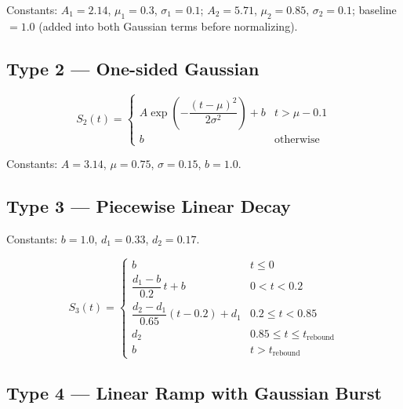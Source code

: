 \documentclass{article}
\begin{document}
\noindent
Constants: $A_1 = 2.14$, $\mu_1 = 0.3$, $\sigma_1 = 0.1$; $A_2 = 5.71$, $\mu_2 = 0.85$,
$\sigma_2 = 0.1$; baseline $= 1.0$ (added into both Gaussian terms before normalizing).

\subsection*{Type 2 --- One-sided Gaussian}

\begin{equation}\label{eq:type2}
    S_2(t) = \begin{cases}
        A \exp\!\left(-\dfrac{(t - \mu)^2}{2\sigma^2}\right) + b & t > \mu - 0.1 \\[6pt]
        b & \text{otherwise}
    \end{cases}
\end{equation}

\noindent
Constants: $A = 3.14$, $\mu = 0.75$, $\sigma = 0.15$, $b = 1.0$.

\subsection*{Type 3 --- Piecewise Linear Decay}

Constants: $b = 1.0$, $d_1 = 0.33$, $d_2 = 0.17$.

\begin{equation}\label{eq:type3}
    S_3(t) = \begin{cases}
        b                                                              & t \leq 0            \\[4pt]
        \dfrac{d_1 - b}{0.2}\,t + b                                   & 0 < t < 0.2         \\[8pt]
        \dfrac{d_2 - d_1}{0.65}(t - 0.2) + d_1                      & 0.2 \leq t < 0.85   \\[6pt]
        d_2                                                            & 0.85 \leq t \leq t_{\mathrm{rebound}} \\[4pt]
        b                                                              & t > t_{\mathrm{rebound}}
    \end{cases}
\end{equation}

\subsection*{Type 4 --- Linear Ramp with Gaussian Burst}
\end{document}
